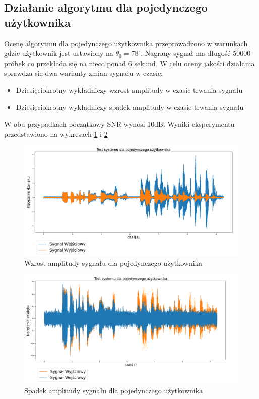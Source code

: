 \subsection{Działanie algorytmu dla pojedynczego użytkownika}

Ocenę algorytmu dla pojedynczego użytkownika przeprowadzono w warunkach gdzie użytkownik jest ustawiony na $\theta_{0}=78^{\circ}$. Nagrany sygnał ma długość 50000 próbek co przekłada się na nieco ponad 6 sekund.
\noindent W celu oceny jakości działania sprawdza się dwa warianty zmian sygnału w czasie:
\begin{itemize}
    \item Dziesięciokrotny wykładniczy wzrost amplitudy w czasie trwania sygnału
    \item Dziesięciokrotny wykładniczy spadek amplitudy w czasie trwania sygnału
\end{itemize}

\noindent W obu przypadkach początkowy SNR wynosi 10dB. Wyniki eksperymentu przedstawiono na wykresach \ref{fig:single_user_increasing} i \ref{fig:single_user_decreasing}

\begin{figure}[h]
    \centering
    \includegraphics[width=\textwidth]{Images/single_user_increasing.png}
    \caption{Wzrost amplitudy sygnału dla pojedynczego użytkownika}
    \label{fig:single_user_increasing}
\end{figure}

\begin{figure}[h]
    \centering
    \includegraphics[width=\textwidth]{Images/single_user_decreasing.png}
    \caption{Spadek amplitudy sygnału dla pojedynczego użytkownika}
    \label{fig:single_user_decreasing}
\end{figure}

